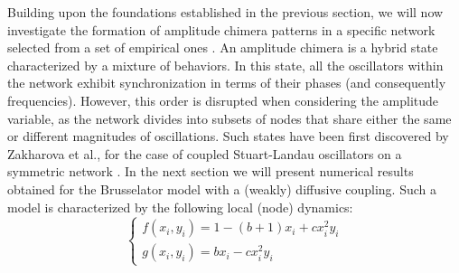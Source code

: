 \documentclass[prx,twocolumn,amsmath,noshowkeys,noshowpacs,amssymb]{revtex4-2}
\begin{document}
Building upon the foundations established in the previous section, we will now investigate the formation of amplitude chimera patterns in a specific network selected from a set of empirical ones \cite{OBrien_NN}. An amplitude chimera is a hybrid state characterized by a mixture of behaviors. In this state, all the oscillators within the network exhibit synchronization in terms of their phases (and consequently frequencies). However, this order is disrupted when considering the amplitude variable, as the network divides into subsets of nodes that share either the same or different magnitudes of oscillations. Such states have been first discovered by Zakharova et al., for the case of coupled Stuart-Landau oscillators on a symmetric network \cite{amp_chimera}. In the next section we will present numerical results obtained for the Brusselator model with a {(weakly)} diffusive coupling. Such a model is characterized by the following local (node) dynamics: 
\begin{equation}
\begin{cases}
f(x_i,y_i)=1-(b+1)x_i+cx_i^2y_i\\
g(x_i,y_i)=bx_i-cx_i^2y_i
\end{cases}
\label{eq:Bruss}
\end{equation} 
\end{document}
